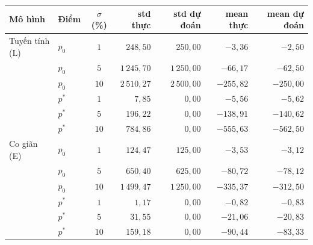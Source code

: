 
\begin{tabular}{@{}llcrrrr@{}}
\toprule
Mô hình & Điểm & $\sigma$ (\%) & std thực & std dự đoán & mean thực & mean dự đoán \\
\midrule
Tuyến tính (L) & $p_0$ & $1$ & $248{,}50$ & $250{,}00$ & ${-}3{,}36$ & ${-}2{,}50$ \\
 & $p_0$ & $5$ & $1\,245{,}70$ & $1\,250{,}00$ & ${-}66{,}17$ & ${-}62{,}50$ \\
 & $p_0$ & $10$ & $2\,510{,}27$ & $2\,500{,}00$ & ${-}255{,}82$ & ${-}250{,}00$ \\
 & $p^*$ & $1$ & $7{,}85$ & $0{,}00$ & ${-}5{,}56$ & ${-}5{,}62$ \\
 & $p^*$ & $5$ & $196{,}22$ & $0{,}00$ & ${-}138{,}91$ & ${-}140{,}62$ \\
 & $p^*$ & $10$ & $784{,}86$ & $0{,}00$ & ${-}555{,}63$ & ${-}562{,}50$ \\
\midrule
Co giãn (E) & $p_0$ & $1$ & $124{,}47$ & $125{,}00$ & ${-}3{,}53$ & ${-}3{,}12$ \\
 & $p_0$ & $5$ & $650{,}40$ & $625{,}00$ & ${-}80{,}72$ & ${-}78{,}12$ \\
 & $p_0$ & $10$ & $1\,499{,}47$ & $1\,250{,}00$ & ${-}335{,}37$ & ${-}312{,}50$ \\
 & $p^*$ & $1$ & $1{,}17$ & $0{,}00$ & ${-}0{,}82$ & ${-}0{,}83$ \\
 & $p^*$ & $5$ & $31{,}55$ & $0{,}00$ & ${-}21{,}06$ & ${-}20{,}83$ \\
 & $p^*$ & $10$ & $159{,}18$ & $0{,}00$ & ${-}90{,}44$ & ${-}83{,}33$ \\
\bottomrule
\end{tabular}
